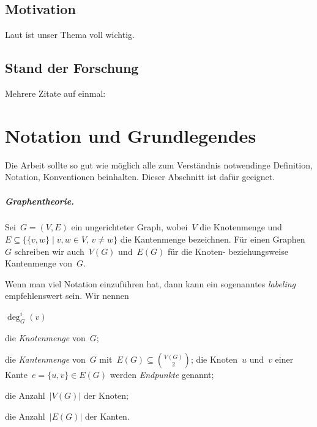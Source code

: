\documentclass[a4paper,titlepage,twocolumn,oneside,12pt,ngerman,titlepage=firstiscover]{scrbook}
\theoremstyle{plain} %
\theoremstyle{definition} %
\theoremstyle{remark} %
\theoremstyle{plain}
\begin{document}
\newcommand{\vehiclecaps}{B}
\newcommand{\vehiclecap}{\beta}
\newcommand{\vehicetype}{v}
\newcommand{\soc}{q}
\newcommand{\places}{\mathcal{X}}
\newcommand{\depot}{\delta}
\newcommand{\depots}{D}
\newcommand{\trips}{\mathcal{T}}
\newcommand{\trip}{\tau}
\newcommand{\chargers}{\mathcal{C}}
\newcommand{\charges}{Z}
\newcommand{\timefunc}{T}
\newcommand{\energyfunc}{Q}
\newcommand{\numbervt}{m}
\newcommand{\chargefunc}{Q^C}
\newcommand{\charge}{\zeta}
\newcommand{\vehicleschedule}{\psi}
\newcommand{\schedule}{\Psi}
\newcommand{\evehicleschedule}{\omega}
\newcommand{\eschedule}{\Omega}
\newcommand{\departure}{d}
\newcommand{\arrival}{a}
\newcommand{\timestart}{s}
\newcommand{\timeend}{e}
\newcommand{\chargestation}{c}
\newcommand{\vehicletypes}{\mathcal{V}}




\section{Motivation}\label{sec:motivation}

Laut \citet{Nie06} ist unser Thema voll wichtig.

\section{Stand der Forschung}

Mehrere Zitate auf einmal: \citet{Nie06,GJ79,KN12}


\chapter{Notation und Grundlegendes}\label{ch:notation}

Die Arbeit sollte so gut wie möglich alle zum Verständnis notwendinge Definition, Notation, Konventionen beinhalten.
Dieser Abschnitt ist dafür geeignet.

\paragraph*{Graphentheorie.} 
Sei~$G=(V,E)$ ein ungerichteter Graph, wobei~$V$ die Knotenmenge und~$E\subseteq \{\{v,w\}\mid v,w\in V,\, v\neq w\}$ die Kantenmenge bezeichnen.
Für einen Graphen~$G$ schreiben wir auch~$V(G)$ und~$E(G)$ für die Knoten- beziehungsweise Kantenmenge von~$G$.

Wenn man viel Notation einzuführen hat, dann kann ein sogenanntes \emph{labeling} empfehlenswert sein.
Wir nennen
\begin{labeling}{$\deg^i_G(v)$}
	\item[$V(G)$] die \emph{Knotenmenge} von~$G$;
	\item[$E(G)$] die \emph{Kantenmenge} von~$G$ mit~$E(G) \subseteq \binom{V(G)}{2}$; die Knoten~$u$ und~$v$ einer Kante~$e = \{u, v\} \in E(G)$ werden \emph{Endpunkte} genannt;
	\item[$n_G$] die Anzahl~$|V(G)|$ der Knoten;
	\item[$m_G$] die Anzahl~$|E(G)|$ der Kanten.
\end{labeling}
\end{document}
